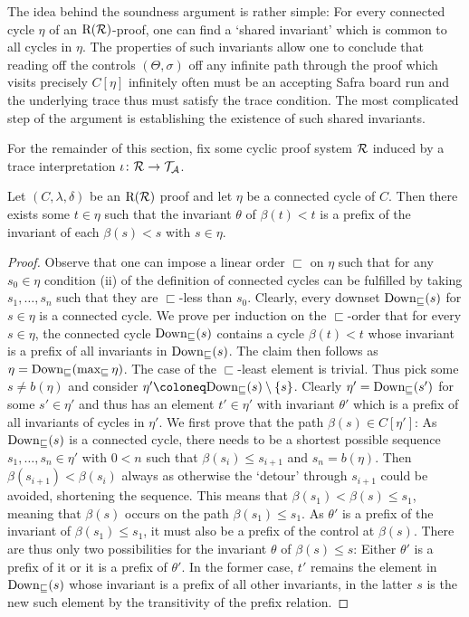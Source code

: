 The idea behind the soundness argument is rather simple: For every connected
cycle $\eta$ of an $\mathrm{R}(\mathcal{R})$-proof, one can find a `shared invariant' which is
common to all cycles in $\eta$. The properties of such invariants allow one to
conclude that reading off the controls $(\Theta, \sigma)$ off any infinite path
through the proof which visits precisely $C[\eta]$ infinitely often must be an
accepting Safra board run and the underlying trace thus must satisfy the trace
condition. The most complicated step of the argument is establishing the
existence of such shared invariants.

For the remainder of this section, fix some cyclic proof system $\mathcal{R}$ induced
by a trace interpretation $\iota \colon \mathcal{R} \to \mathcal{T}_{\mathcal{A}}$.

\begin{proposition}\label{lem:induced-io}
  Let $(C, \lambda, \delta)$ be an $\mathrm{R}(\mathcal{R})$ proof and let $\eta$ be a connected cycle of $C$.
  Then there exists some $t \in \eta$ such that the invariant $\theta$ of
  $\beta(t) < t$ is a prefix of the invariant of each $\beta(s) < s$ with $s \in
  \eta$.
\end{proposition}
\begin{proof}
  Observe that one can impose a linear order $\sqsubset$ on $\eta$ such that for
  any $s_0 \in \eta$ condition (ii) of the definition of connected cycles
  can be fulfilled by taking $s_1, \ldots, s_n$ such that they are
  $\sqsubset$-less than $s_0$. Clearly, every downset $\mathrm{Down}_{\sqsubseteq}(s)$
  for $s \in \eta$ is a connected cycle. We prove per induction on the $\sqsubset$-order
  that for every $s \in \eta$, the connected cycle $\mathrm{Down}_{\sqsubseteq}(s)$
  contains a cycle $\beta(t) < t$ whose invariant is a prefix of all invariants
  in $\mathrm{Down}_{\sqsubseteq}(s)$. The claim then follows
  as $\eta = \mathrm{Down}_{\sqsubseteq}(\max_{\sqsubseteq}\eta)$.
  The case of the $\sqsubset$-least element is trivial. Thus pick some $s \neq
  b(\eta)$ and consider $\eta' \coloneq \Down_{\sqsubseteq}(s) \setminus
  \{s\}$. Clearly $\eta' = \mathrm{Down}_{\sqsubseteq}(s')$ for some $s' \in \eta'$ and
  thus has an element $t' \in \eta'$ with invariant
  $\theta'$ which is a prefix of all invariants of cycles in $\eta'$. We first
  prove that the path $\beta(s) \in C[\eta']$: As
  $\mathrm{Down}_{\sqsubseteq}(s)$ is a connected cycle, 
  there needs to be a shortest possible sequence $s_1, \ldots, s_n \in \eta'$ with $0 < n$
  such that $\beta(s_i) \leq s_{i + 1}$ and $s_n = b(\eta)$. Then $\beta(s_{i +
    1}) < \beta(s_i)$ always as otherwise the `detour' through $s_{i + 1}$ could be
  avoided, shortening the sequence. This means that $\beta(s_1) < \beta(s) \leq s_1$,
  meaning that $\beta(s)$ occurs on the path $\beta(s_1) \leq s_1$. As $\theta'$
  is a prefix of the invariant of $\beta(s_1) \leq s_1$, it must also be a
  prefix of the control at $\beta(s)$.
  There are thus only two possibilities for the
  invariant $\theta$ of $\beta(s) \leq s$: Either $\theta'$ is a prefix of it or it is
  a prefix of $\theta'$. In the former case, $t'$ remains the
  element in $\mathrm{Down}_{\sqsubseteq}(s)$ whose invariant is a prefix of all other
  invariants, in the latter $s$ is the new such element by the transitivity of
  the prefix relation.
\end{proof}

